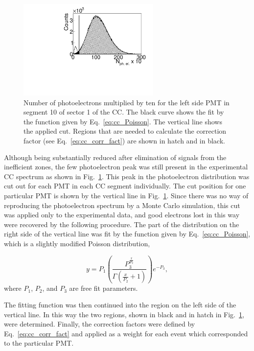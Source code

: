 \documentclass[prc,twocolumn,superscriptaddress,showpacs,amssymb,amsmath,amsfonts,aps,nofootinbib]{revtex4-1}
\begin{document}
\begin{figure}[htp]
\begin{center}
 \includegraphics[width=7cm,keepaspectratio]{pictures/electron_id/ph_el.pdf}
\vspace{-0.1cm}
\caption{Number of photoelectrons multiplied by ten for the left side PMT in segment 10 of sector 1 of the CC. The black curve shows the fit by the function given by Eq.~\eqref{eq:cc_Poisson}. The vertical line shows the applied cut. Regions that are needed to calculate the correction factor (see Eq.~\eqref{eq:cc_corr_fact}) are shown in hatch and in black. }
\label{fig:ph_el}
\end{center}
\end{figure} 
 

 



Although being substantially reduced after elimination of signals from the inefficient zones, the few photoelectron peak was still present in the experimental CC spectrum as shown in Fig.~\ref{fig:ph_el}. This peak in the  photoelectron distribution was cut out for each PMT in each CC segment individually. The cut position for one particular PMT is shown by the vertical line in Fig.~\ref{fig:ph_el}.
Since there was no way  of reproducing the photoelectron spectrum by a Monte Carlo simulation, this cut was applied only to the experimental data, and good electrons lost in this way were recovered by the following procedure. The part of the distribution on the right side of the vertical line was fit by the function given by Eq.~\eqref{eq:cc_Poisson}, which is a slightly modified Poisson distribution, 

\begin{equation}
y = P_{1}\left(\frac{P_{3}^{\frac{x}{P_{2}}}}{\Gamma\left(\frac{x}{P_{2}}+1\right)}
\right)e^{-P_{3}},
\label{eq:cc_Poisson}
\end{equation}
where $P_{1}$, $P_{2}$, and $P_{3}$ are free fit parameters.

The fitting function was then continued into the region on the left side of the vertical line. In this way the two regions, shown in black and in hatch in Fig.~\ref{fig:ph_el}, were determined. Finally, the correction factors were defined by Eq.~\eqref{eq:cc_corr_fact} and applied as a weight for each event which corresponded to the particular PMT. 
\end{document}
